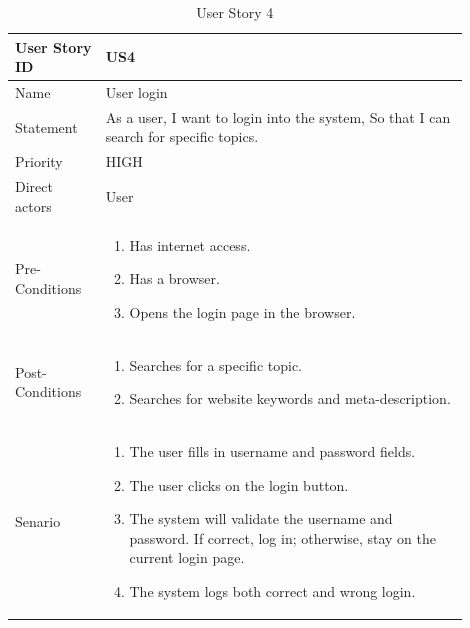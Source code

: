 \documentclass{scrartcl}
\begin{document}
\begin{table}[H]
  \caption{User Story 4}
  \begin{tabular}{p{0.18\linewidth} | p{0.72\linewidth}}
    \toprule
    User Story ID & US4
    \\\midrule
    Name & User login
    \\\hline
    Statement & As a user, I want to login into the system, So that I can search for specific topics.
    \\\hline
    Priority & HIGH
    \\\hline
    Direct actors & User
    \\\hline
    Pre-Conditions & {
                     \begin{enumerate}
                     \item Has internet access.
                     \item Has a browser.
                     \item Opens the login page in the browser.
                     \end{enumerate}
                     }\vspace*{-\baselineskip}
    \\\hline
    Post-Conditions & {
                      \begin{enumerate}
                      \item Searches for a specific topic.
                      \item Searches for website keywords and meta-description.
                      \end{enumerate}
                      }\vspace*{-\baselineskip}
    \\\hline
    Senario & {
              \begin{enumerate}
              \item The user fills in username and password fields.
              \item The user clicks on the login button.
              \item The system will validate the username and password. If correct, log in; otherwise, stay on the current login page.
              \item The system logs both correct and wrong login.
              \end{enumerate}
              }\vspace*{-\baselineskip}
    \\\bottomrule
  \end{tabular}
\end{table}
\end{document}
